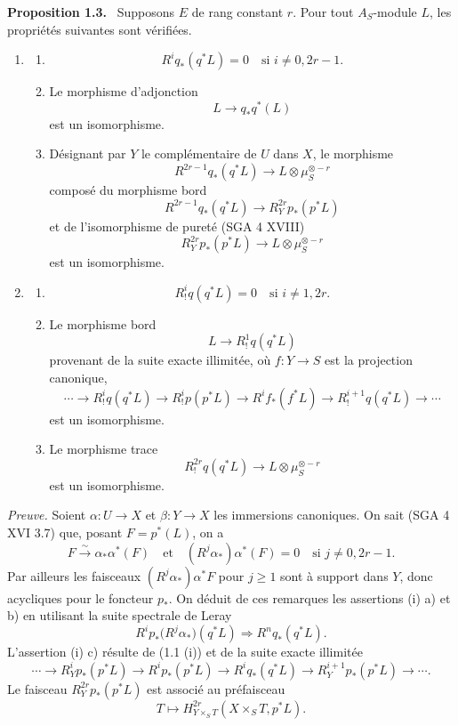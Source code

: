 \documentclass[11pt]{article}
\newenvironment{statement}[1]{\par\medskip\noindent\textbf{#1.}\ }{\par\medskip}
\begin{document}
\begin{statement}{Proposition 1.3}
Supposons $E$ de rang constant $r$. Pour tout $A_S$-module $L$, les propriétés suivantes sont vérifiées.
\begin{enumerate}[label=(\roman*)]
\item
\begin{enumerate}[label=\alph*)]
\item
\[
R^i q_*(q^*L)=0\quad\text{si }i\ne 0,2r-1.
\]
\item Le morphisme d'adjonction
\[
L\longrightarrow q_*q^*(L)
\]
est un isomorphisme.
\item Désignant par $Y$ le complémentaire de $U$ dans $X$, le morphisme
\[
R^{2r-1}q_*(q^*L)\longrightarrow L\otimes\mu_S^{\otimes -r}
\]
composé du morphisme bord
\[
R^{2r-1}q_*(q^*L)\longrightarrow R_Y^{2r}p_*(p^*L)
\tag{1}
\]
et de l'isomorphisme de pureté (SGA 4 XVIII)
\[
R_Y^{2r}p_*(p^*L)\longrightarrow L\otimes\mu_S^{\otimes -r}
\]
est un isomorphisme.
\end{enumerate}
\item
\begin{enumerate}[label=\alph*)]
\item
\[
R_!^i q(q^*L)=0\quad\text{si }i\ne 1,2r.
\]
\item Le morphisme bord
\[
L\longrightarrow R_!^1 q(q^*L)
\]
provenant de la suite exacte illimitée, où $f:Y\to S$ est la projection canonique,
\[
\cdots\longrightarrow R_!^i q(q^*L)\longrightarrow R_!^i p(p^*L)
\longrightarrow R^i f_*(f^*L)\longrightarrow R_!^{i+1}q(q^*L)\longrightarrow\cdots
\]
est un isomorphisme.
\item Le morphisme trace
\[
R_!^{2r}q(q^*L)\longrightarrow L\otimes\mu_S^{\otimes -r}
\]
est un isomorphisme.
\end{enumerate}
\end{enumerate}
\end{statement}

\emph{Preuve.} Soient $\alpha:U\to X$ et $\beta:Y\to X$ les immersions canoniques. On sait (SGA 4 XVI 3.7) que, posant $F=p^*(L)$, on a
\[
F\xrightarrow{\sim}\alpha_*\alpha^*(F)
\quad\text{et}\quad
(R^j\alpha_*)\alpha^*(F)=0\quad\text{si }j\ne0,2r-1.
\]
Par ailleurs les faisceaux $(R^j\alpha_*)\alpha^*F$ pour $j\ge1$ sont à support dans $Y$, donc acycliques pour le foncteur $p_*$. On déduit de ces remarques les assertions (i) a) et b) en utilisant la suite spectrale de Leray
\[
R^i p_*\bigl(R^j\alpha_*\bigr)(q^*L)\Longrightarrow R^n q_*(q^*L).
\]
L'assertion (i) c) résulte de (1.1 (i)) et de la suite exacte illimitée
\[
\cdots\longrightarrow R_Y^i p_*(p^*L)\longrightarrow R^i p_*(p^*L)\longrightarrow R^i q_*(q^*L)
\longrightarrow R_Y^{i+1}p_*(p^*L)\longrightarrow\cdots.
\]
Le faisceau $R_Y^{2r}p_*(p^*L)$ est associé au préfaisceau
\[
T\longmapsto H^{2r}_{Y\times_S T}(X\times_S T,p^*L).
\]
\end{document}
